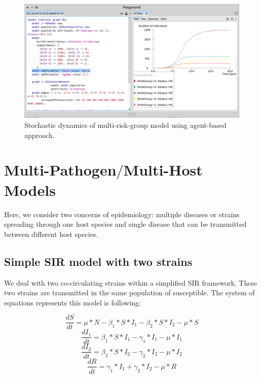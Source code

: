\documentclass[a4paper,10pt,twoside]{book}
\begin{document}
\begin{figure}

\begin{center}
\includegraphics[width=1.0\textwidth]{figures/Multi_Risk_IBM.png}\caption{Stochastic dynamics of multi-risk-group model using agent-based approach.\label{Multi_Risk_IBM}}\end{center}
\end{figure}

\chapter{ Multi-Pathogen$/$Multi-Host Models}
Here, we consider two concerns of epidemiology: multiple diseases or strains spreading through one host species and single disease that can be transmitted between different host species.
\section{ Simple SIR model with two strains}
We deal with two co-circulating strains within a simplified SIR framework. These two strains are transmitted in the same population of susceptible.
The system of equations represents this model is following:

 \begin{equation}
  \frac{dS}{dt} = \mu*N - \beta_1*S*I_1 - \beta_2*S*I_2 - \mu*S
 \end{equation}
 \begin{equation}
  \frac{dI_1}{dt} = \beta_1*S*I_1 - \gamma_1*I_1 - \mu*I_1
 \end{equation}
 \begin{equation}
  \frac{dI_2}{dt} = \beta_2*S*I_2 - \gamma_2*I_2 - \mu*I_2
 \end{equation}
 \begin{equation}
  \frac{dR}{dt} = \gamma_1*I_1 + \gamma_2*I_2 - \mu*R
 \end{equation}
\end{document}
